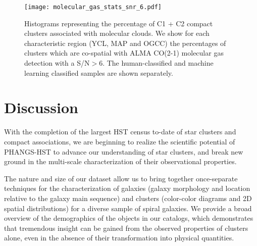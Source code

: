 \documentclass[linenumbers]{aastex63}
\begin{document}
{%









%

%
%
\begin{figure} 
\texttt{[image: molecular\_gas\_stats\_snr\_6.pdf]}
\caption{Histograms representing the percentage of C1 + C2 compact clusters associated with molecular clouds. We show for each characteristic region (YCL, MAP and OGCC) the percentages of clusters which are co-spatial with ALMA CO(2-1) molecular gas detection with a S/N$>6$. The human-classified and machine learning classified samples are shown separately.}
 \label{fig:dist_gmc}
\end{figure}
%
\section{Discussion}\label{sect:discussion}

With the completion of the largest HST census to-date of star clusters and compact associations, we are beginning to realize the scientific potential of PHANGS-HST to advance our understanding of star clusters, and break new ground in the multi-scale characterization of their observational properties.  

The nature and size of our dataset allow us to bring together once-separate techniques for the characterization of galaxies (galaxy morphology and location relative to the galaxy main sequence) and clusters (color-color diagrams and 2D spatial distributions) for a diverse sample of spiral galaxies.  We provide a broad overview of the demographics of the objects in our catalogs, which demonstrates that tremendous insight can be gained from the observed properties of clusters alone, even in the absence of their transformation into physical quantities.  

}
\end{document}
